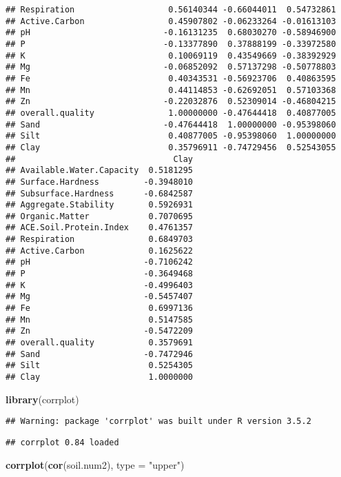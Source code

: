 \documentclass[]{article}
\newenvironment{Shaded}{\begin{snugshade}}{\end{snugshade}}
\newcommand{\KeywordTok}[1]{\textcolor[rgb]{0.13,0.29,0.53}{\textbf{#1}}}
\newcommand{\DataTypeTok}[1]{\textcolor[rgb]{0.13,0.29,0.53}{#1}}
\newcommand{\StringTok}[1]{\textcolor[rgb]{0.31,0.60,0.02}{#1}}
\newcommand{\NormalTok}[1]{#1}
\begin{document}
\begin{verbatim}
## Respiration                   0.56140344 -0.66044011  0.54732861
## Active.Carbon                 0.45907802 -0.06233264 -0.01613103
## pH                           -0.16131235  0.68030270 -0.58946900
## P                            -0.13377890  0.37888199 -0.33972580
## K                             0.10069119  0.43549669 -0.38392929
## Mg                           -0.06852092  0.57137298 -0.50778803
## Fe                            0.40343531 -0.56923706  0.40863595
## Mn                            0.44114853 -0.62692051  0.57103368
## Zn                           -0.22032876  0.52309014 -0.46804215
## overall.quality               1.00000000 -0.47644418  0.40877005
## Sand                         -0.47644418  1.00000000 -0.95398060
## Silt                          0.40877005 -0.95398060  1.00000000
## Clay                          0.35796911 -0.74729456  0.52543055
##                                Clay
## Available.Water.Capacity  0.5181295
## Surface.Hardness         -0.3948010
## Subsurface.Hardness      -0.6842587
## Aggregate.Stability       0.5926931
## Organic.Matter            0.7070695
## ACE.Soil.Protein.Index    0.4761357
## Respiration               0.6849703
## Active.Carbon             0.1625622
## pH                       -0.7106242
## P                        -0.3649468
## K                        -0.4996403
## Mg                       -0.5457407
## Fe                        0.6997136
## Mn                        0.5147585
## Zn                       -0.5472209
## overall.quality           0.3579691
## Sand                     -0.7472946
## Silt                      0.5254305
## Clay                      1.0000000
\end{verbatim}

\begin{Shaded}
\begin{Highlighting}[]
\KeywordTok{library}\NormalTok{(corrplot)}
\end{Highlighting}
\end{Shaded}

\begin{verbatim}
## Warning: package 'corrplot' was built under R version 3.5.2
\end{verbatim}

\begin{verbatim}
## corrplot 0.84 loaded
\end{verbatim}

\begin{Shaded}
\begin{Highlighting}[]
\KeywordTok{corrplot}\NormalTok{(}\KeywordTok{cor}\NormalTok{(soil.num2), }\DataTypeTok{type =} \StringTok{"upper"}\NormalTok{)}
\end{Highlighting}
\end{Shaded}
\end{document}
